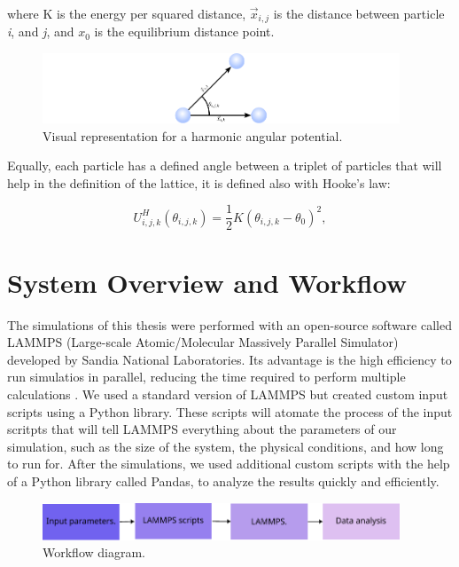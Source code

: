 where K is the energy per squared distance, $\vec{x}_{i,j}$ is the distance between particle \textit{i}, and \textit{j}, and $x_0$ is the equilibrium distance point.

\begin{figure}
  \begin{center}
    \includegraphics[width=0.95\textwidth]{figures/harmonicP.pdf}
  \end{center}
  \caption[Visual representation for a harmonic potential.]{Visual representation for a harmonic angular potential.}\label{fig:}
\end{figure}


Equally, each particle has a defined angle between a triplet of particles that will help in the definition of the lattice, it is defined also with Hooke's law:

\begin{equation}
  U^{H}_{i,j,k}(\theta _{i,j,k}) = \frac{1}{2}K(\theta_{i,j,k} - \theta_0)^2,
\end{equation}



\section{System Overview and Workflow}

The simulations of this thesis were performed with an open-source software called LAMMPS (Large-scale Atomic/Molecular Massively Parallel Simulator) developed by Sandia National Laboratories. Its advantage is the high efficiency to run simulatios in parallel, reducing the time required to perform multiple calculations \cite{LAMMPS}. We used a standard version of LAMMPS but created custom input scripts using a Python library. These scripts will atomate the process of the input scritpts that will tell LAMMPS everything about the parameters of our simulation, such as the size of the system, the physical conditions, and how long to run for. After the simulations, we used additional custom scripts with the help of a Python library called Pandas, to analyze the results quickly and efficiently.

\begin{figure}[h]
  \begin{center}
    \includegraphics[width=0.95\textwidth]{figures/workflow.pdf}
  \end{center}
  \caption[Workflow diagram.]{Workflow diagram.}\label{fig:workflow}
\end{figure}


